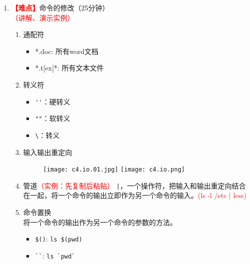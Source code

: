\documentclass{TIJMUjiaoanLL}
\begin{document}
\begin{enumerate}
    \item \textcolor{red}{\textbf{【难点】}}命令的修改（25分钟）\\ \textcolor{red}{（讲解、演示实例）}
    \begin{enumerate}
      \item 通配符
	\begin{itemize}
	  \item *.doc: 所有word文档
	  \item *.t[ex]*: 所有文本文件
	\end{itemize}
      \item 转义符
	\begin{itemize}
	  \item \verb|''|：硬转义
	  \item \verb|""|：软转义
	  \item \verb|\|：转义
	\end{itemize}
      \item 输入输出重定向
        \vspace*{-10pt}
	\begin{figure}[h]
	  \centering
	  \texttt{[image: c4.io.01.jpg]}
	  \quad
	  \texttt{[image: c4.io.png]}
	\end{figure}
        \vspace*{-10pt}

\otherTail
\newpage
\otherHeader

      \item 管道\textcolor{red}{（实例：先复制后粘贴）}
	\verb=|=，一个操作符，把输入和输出重定向结合在一起，将一个命令的输出立即作为另一个命令的输入。\textcolor{red}{(ls -l /etc | less)}
      \item 命令置换
	\\ 将一个命令的输出作为另一个命令的参数的方法。
	\begin{itemize}
	  \item \verb|$()|: \verb|ls $(pwd)|
	  \item \verb|``|: \verb|ls `pwd`|
	\end{itemize}
    \end{enumerate}


\end{enumerate}
\end{document}
